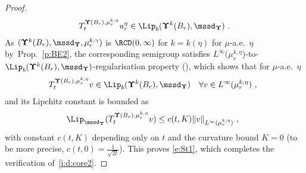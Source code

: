 \documentclass[11pt,letterpaper]{amsart}
\newcommand{\set}[1]{\left\{#1\right\}}							%
\DeclareMathOperator{\car}{\mathbf 1}
\newcommand{\comma}{\,\,\mathrm{,}\;\,}
\newcommand{\fstop}{\,\,\mathrm{.}}
\newcommand{\QP}{{\mu}}
\newcommand{\dUpsilon}{{\mathbf \Upsilon}}
\newcommand{\U}{\dUpsilon}
\renewcommand{\1}{\mathbf 1}
\numberwithin{equation}{section}
\theoremstyle{plain}
\theoremstyle{definition}
\theoremstyle{remark}
\begin{document}
\begin{proof}
\begin{align}\label{e:St1}
T_{t}^{\U(B_r), \QP_r^{k, \eta}}u_{r}^{\eta} \in \Lip_b(\U^k(B_r), \mssd_\U) \fstop
\end{align}
As $(\U^k(B_r), \mssd_\U, \mu_r^{k, \gamma})$ is $\RCD(0,\infty)$ for $k=k(\eta)$ for $\QP$-a.e.~$\eta$ by~Prop.~\ref{p:BE2}, the corresponding semigroup satisfies $L^\infty(\QP_r^{k, \eta}$)-to-$\Lip_b(\U^k(B_r), \mssd_\U)$-regularisation property (\cite[Thm.\ 6.5]{AmbGigSav14}), which shows that for $\QP$-a.e.~$\eta$
\begin{align*} %
T_{t}^{\U(B_r), \QP_r^{k, \eta}}v \in \Lip_b(\U^k(B_r), \mssd_\U) \quad \forall v \in L^\infty(\QP_r^{k, \eta}) \comma
\end{align*}
and its Lipchitz constant is bounded as 
$$\Lip_{\mssd_\U}(T_{t}^{\U(B_r), \QP_r^{k, \eta}}v) \le c(t, K)\|v\|_{L^\infty(\QP_r^{k, \eta})}  \comma$$
 with constant $c(t, K)$ depending only on $t$ and the curvature bound $K=0$ (to be more precise, $c(t, 0)=\frac{1}{\sqrt{2t}}$). This proves \eqref{e:St1}, which completes the verification of~\ref{i:d:core2}. 
%

\end{proof}
\end{document}
